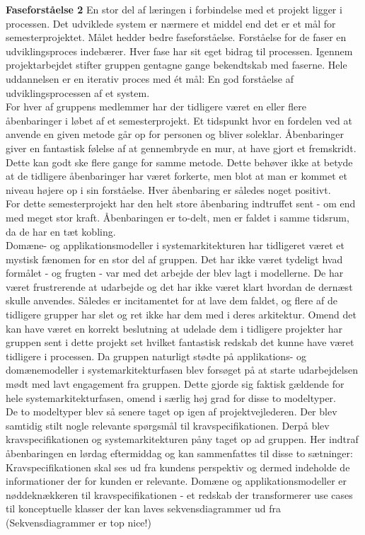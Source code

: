 \textbf{Faseforståelse 2}
En stor del af læringen i forbindelse med et projekt ligger i processen. Det udviklede system er nærmere et middel end det er et mål for semesterprojektet. Målet hedder bedre faseforståelse. Forståelse for de faser en udviklingsproces indebærer. Hver fase har sit eget bidrag til processen. Igennem projektarbejdet stifter gruppen gentagne gange bekendtskab med faserne. Hele uddannelsen er en iterativ proces med ét mål: En god forståelse af udviklingsprocessen af et system.\\
For hver af gruppens medlemmer har der tidligere været en eller flere åbenbaringer i løbet af et semesterprojekt. Et tidspunkt hvor en fordelen ved at anvende en given metode går op for personen og bliver soleklar. Åbenbaringer giver en fantastisk følelse af at gennembryde en mur, at have gjort et fremskridt. Dette kan godt ske flere gange for samme metode. Dette behøver ikke at betyde at de tidligere åbenbaringer har været forkerte, men blot at man er kommet et niveau højere op i sin forståelse. Hver åbenbaring er således noget positivt.\\
For dette semesterprojekt har den helt store åbenbaring indtruffet sent - om end med meget stor kraft.
Åbenbaringen er to-delt, men er faldet i samme tidsrum, da de har en tæt kobling.\\
Domæne- og applikationsmodeller i systemarkitekturen har tidligeret været et mystisk fænomen for en stor del af gruppen. Det har ikke været tydeligt hvad formålet - og frugten - var med det arbejde der blev lagt i modellerne. De har været frustrerende at udarbejde og det har ikke været klart hvordan de dernæst skulle anvendes. Således er incitamentet for at lave dem faldet, og flere af de tidligere grupper har slet og ret ikke har dem med i deres arkitektur. Omend det kan have været en korrekt beslutning  at udelade dem i tidligere projekter har gruppen sent i dette projekt set hvilket fantastisk redskab det kunne have været tidligere i processen. Da gruppen naturligt stødte på applikations- og domænemodeller i systemarkitekturfasen blev forsøget på at starte udarbejdelsen mødt med lavt engagement fra gruppen. Dette gjorde sig faktisk gældende for hele systemarkitekturfasen, omend i særlig høj grad for disse to modeltyper.\\
De to modeltyper blev så senere taget op igen af projektvejlederen. Der blev samtidig stilt nogle relevante spørgsmål til kravspecifikationen. Derpå blev kravspecifikationen og systemarkitekturen påny taget op ad gruppen. Her indtraf åbenbaringen en lørdag eftermiddag og kan sammenfattes til disse to sætninger:\\
Kravspecifikationen skal ses ud fra kundens perspektiv og dermed indeholde de informationer der for kunden er relevante.
Domæne og applikationsmodeller er nøddeknækkeren til kravspecifikationen - et redskab der transformerer use cases til konceptuelle klasser der kan laves sekvensdiagrammer ud fra (Sekvensdiagrammer er top nice!)\\

